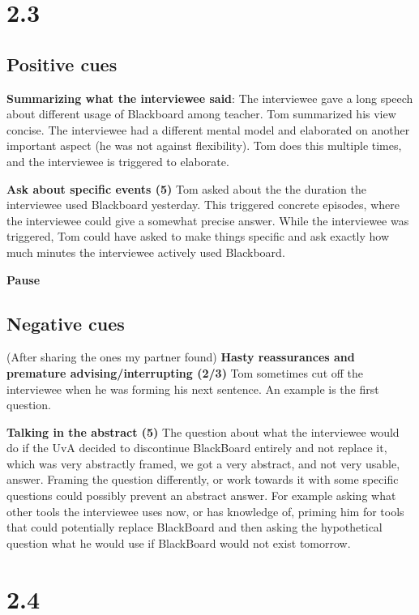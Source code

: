 \section*{2.3}

\subsection*{Positive cues}
\textbf{Summarizing what the interviewee said}: The interviewee gave a long speech about different usage of Blackboard among teacher. Tom summarized his view concise. The interviewee had a different mental model and elaborated on another important aspect (he was not against flexibility). Tom does this multiple times, and the interviewee is triggered to elaborate.

\textbf{Ask about specific events (5)} Tom asked about the the duration the interviewee used Blackboard yesterday. This triggered concrete episodes, where the interviewee could give a somewhat precise answer. While the interviewee was triggered, Tom could have asked to make things specific and ask exactly how much minutes the interviewee actively used Blackboard.

\textbf{Pause}

\subsection*{Negative cues}
(After sharing the ones my partner found)
\textbf{Hasty reassurances and premature advising/interrupting (2/3)} Tom sometimes cut off the interviewee when he was forming his next sentence. An example is the first question. 

\textbf{Talking in the abstract (5)} The question about what the interviewee would do if the UvA decided to discontinue BlackBoard entirely and not replace it, which was very abstractly framed, we got a very abstract, and not very usable, answer. Framing the question differently, or work towards it with some specific questions could possibly prevent an abstract answer. For example asking what other tools the interviewee uses now, or has knowledge of, priming him for tools that could potentially replace BlackBoard and then asking the hypothetical question what he would use if BlackBoard would not exist tomorrow.

\section*{2.4}



